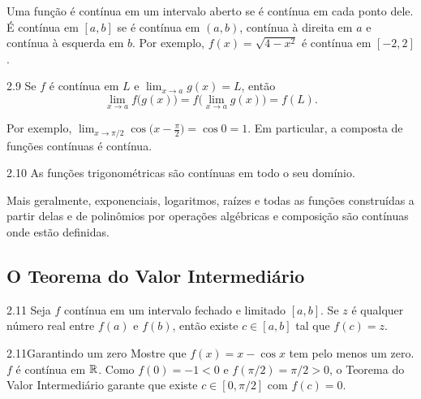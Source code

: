 Uma função é contínua em um intervalo aberto se é contínua em cada ponto dele. É contínua
em $[a,b]$ se é contínua em $(a,b)$, contínua à direita em $a$ e contínua à esquerda em
$b$. Por exemplo, $f(x)=\sqrt{4-x^2}$ é contínua em $[-2,2]$.

\begin{teorema}{2.9}
Se $f$ é contínua em $L$ e $\lim_{x\to a}g(x)=L$, então
\[
\lim_{x\to a}f\big(g(x)\big)=f\Big(\lim_{x\to a}g(x)\Big)=f(L).
\]
\end{teorema}
Por exemplo, $\lim_{x\to\pi/2}\cos\!\big(x-\tfrac\pi2\big)=\cos0=1$. Em particular, a
composta de funções contínuas é contínua.

\begin{teorema}{2.10}
As funções trigonométricas são contínuas em todo o seu domínio.
\end{teorema}

Mais geralmente, exponenciais, logaritmos, raízes e todas as funções construídas a partir
delas e de polinômios por operações algébricas e composição são contínuas onde estão
definidas.

\subsection{O Teorema do Valor Intermediário}

\begin{teorema}{2.11}
Seja $f$ contínua em um intervalo fechado e limitado $[a,b]$. Se $z$ é qualquer número
real entre $f(a)$ e $f(b)$, então existe $c\in[a,b]$ tal que $f(c)=z$.
\end{teorema}


\begin{exemplo}{2.11}{Garantindo um zero}
Mostre que $f(x)=x-\cos x$ tem pelo menos um zero.
\solucao
$f$ é contínua em $\mathbb{R}$. Como $f(0)=-1<0$ e $f(\pi/2)=\pi/2>0$, o Teorema do Valor
Intermediário garante que existe $c\in[0,\pi/2]$ com $f(c)=0$.
\end{exemplo}

